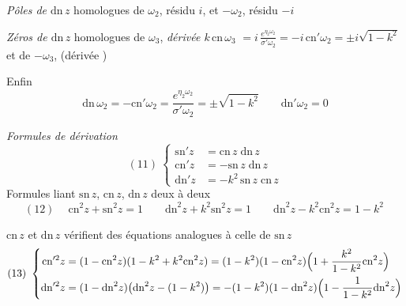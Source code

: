 \documentclass[11pt,a4paper]{article}
\begin{document}
\emph{Pôles de $\mathrm{dn}\,z$} homologues de
$\omega_2$, résidu $i$, et $-\omega_2$, résidu $-i$

\emph{Zéros de $\mathrm{dn}\,z$} homologues de $\omega_3$,
\emph{dérivée $k\,\mathrm{cn}\,\omega_3$}
$= i\,\frac{e^{\eta_2\omega_2}}{\sigma'\omega_2} = -i\,\mathrm{cn}'\omega_2
= \pm i\sqrt{1-k^2}$ et de $-\omega_3$, (dérivée )

Enfin
\[
\mathrm{dn}\,\omega_2 = -\mathrm{cn}'\omega_2 = \frac{e^{\eta_2\omega_2}}{\sigma'\omega_2}
= \pm\sqrt{1-k^2} \qquad \mathrm{dn}'\omega_2 = 0
\]

\emph{Formules de dérivation}
\[
(11)\ \left\lbrace
\begin{aligned}
\mathrm{sn}'z &= \mathrm{cn}\,z\;\mathrm{dn}\,z\\
\mathrm{cn}'z &= -\mathrm{sn}\,z\;\mathrm{dn}\,z\\
\mathrm{dn}'z &= -k^2\,\mathrm{sn}\,z\;\mathrm{cn}\,z
\end{aligned}
\right.
\]
Formules liant $\mathrm{sn}\,z$, $\mathrm{cn}\,z$, $\mathrm{dn}\,z$ deux à deux
\[
(12)\quad \boxed{\ \mathrm{cn}^2 z + \mathrm{sn}^2 z = 1 \qquad
\mathrm{dn}^2 z + k^2\mathrm{sn}^2 z = 1 \qquad
\mathrm{dn}^2 z - k^2\mathrm{cn}^2 z = 1 - k^2\ }
\]

$\mathrm{cn}\,z$ et $\mathrm{dn}\,z$ vérifient des équations analogues à celle de
$\mathrm{sn}\,z$
\[
(13)\ \left\lbrace
\begin{aligned}
\mathrm{cn}'^2 z &= (1-\mathrm{cn}^2 z)(1-k^2+k^2\mathrm{cn}^2 z)
= (1-k^2)(1-\mathrm{cn}^2 z)\Bigl(1 + \frac{k^2}{1-k^2}\mathrm{cn}^2 z\Bigr)\\
\mathrm{dn}'^2 z &= (1-\mathrm{dn}^2 z)\bigl(\mathrm{dn}^2 z - (1-k^2)\bigr)
= -(1-k^2)(1-\mathrm{dn}^2 z)\Bigl(1 - \frac{1}{1-k^2}\mathrm{dn}^2 z\Bigr)
\end{aligned}
\right.
\]
\end{document}

